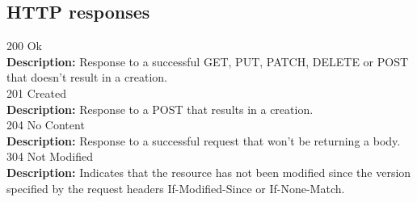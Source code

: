 \documentclass[11pt,a4paper,pdftex]{article}
\begin{document}
\subsection{HTTP responses}
\hspace*{1em}200 Ok\\
\hspace*{2em}\textbf{Description:} Response to a successful GET, PUT, PATCH, DELETE or POST that doesn't result in a creation.\\
\hspace*{1em}201 Created\\
\hspace*{2em}\textbf{Description:} Response to a POST that results in a creation.\\
\hspace*{1em}204 No Content\\
\hspace*{2em}\textbf{Description:} Response to a successful request that won't be returning a body.\\
\hspace*{1em}304 Not Modified\\
\hspace*{2em}\textbf{Description:} Indicates that the resource has not been modified since the version specified by the request headers If-Modified-Since or If-None-Match.
\end{document}
